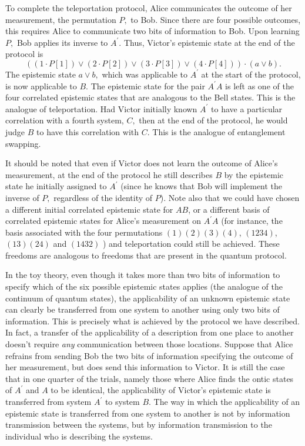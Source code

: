 \documentclass[pra,nofootinbib,showpacs,12pt]{revtex4}
\begin{document}
To complete the teleportation protocol, Alice communicates the outcome of
her measurement, the permutation $P,$ to Bob$.$ Since there are four
possible outcomes, this requires Alice to communicate two bits of
information to Bob. Upon learning $P,$ Bob applies its inverse to $A^{\prime
}$. Thus, Victor's epistemic state at the end of the protocol is
\begin{equation*}
((1\cdot P[1])\vee (2\cdot P[2])\vee (3\cdot P[3])\vee (4\cdot P[4]))\cdot
(a\vee b).
\end{equation*}
The epistemic state $a\vee b,$ which was applicable to $A^{\prime }$ at the
start of the protocol, is now applicable to $B.$ The epistemic state for the
pair $A^{\prime }A$ is left as one of the four correlated epistemic states
that are analogous to the Bell states. This is the analogue of
teleportation. Had Victor initially known $A^{\prime }$ to have a particular
correlation with a fourth system, $C,$ then at the end of the protocol, he
would judge $B$ to have this correlation with $C.$ This is the analogue of
entanglement swapping.

It should be noted that even if Victor does not learn the outcome of Alice's
measurement, at the end of the protocol he still describes $B$ by the
epistemic state he initially assigned to $A^{\prime }$ (since he knows that
Bob will implement the inverse of $P,$ regardless of the identity of $P$).
Note also that we could have chosen a different initial correlated epistemic
state for $AB$, or a different basis of correlated epistemic states for
Alice's measurement on $A^{\prime }A$ (for instance, the basis associated
with the four permutations $(1)(2)(3)(4)$, $(1234)$, $(13)(24)$ and $(1432)$%
) and teleportation could still be achieved. These freedoms are analogous to
freedoms that are present in the quantum protocol.

In the toy theory, even though it takes more than two bits of information to
specify which of the six possible epistemic states applies (the analogue of
the continuum of quantum states), the applicability of an unknown epistemic
state can clearly be transferred from one system to another using only two
bits of information. This is precisely what is achieved by the protocol we
have described. In fact, a transfer of the applicability of a description
from one place to another doesn't require \emph{any} communication between
those locations. Suppose that Alice refrains from sending Bob the two bits
of information specifying the outcome of her measurement, but does send this
information to Victor. It is still the case that in one quarter of the
trials, namely those where Alice finds the ontic states of $A^{\prime }$ and
$A$ to be identical, the applicability of Victor's epistemic state is
transferred from system $A^{\prime }$ to system $B.$ The way in which the
applicability of an epistemic state is transferred from one system to
another is not by information transmission between the systems, but by
information transmission to the individual who is describing the systems.
\end{document}
